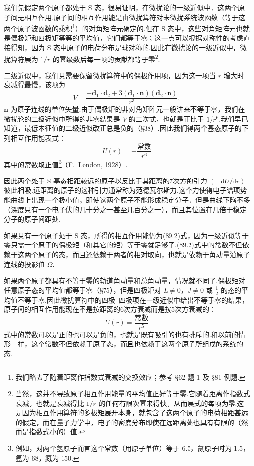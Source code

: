 我们先假定两个原子都处于 S 态，很易证明，在微扰论的一级近似中，这两个原子间无相互作用.原子间的相互作用能是由微扰算符对未微扰系统波函数（等于这两个原子波函数的乘积\footnote{我们略去了随着距离作指数式衰减的交换效应；参考 §62 题 1 及 §81 例题.}）的对角矩阵元确定的.但在 S 态中，这些对角矩阵元也就是偶极矩和四极矩等等的平均值，它们都等于零；这一点可以根据对称性的考虑直接得知，因为 S 态中原子的电荷分布是球对称的.因此在微扰论的一级近似中，微扰算符展为 $1/r$ 的幂级数后每一项的贡献都等于零\footnote{当然，这并不导致原子相互作用能量的平均值正好等于零.它随着距离作指数式衰减，也就是衰减得比 $1/r$ 的任何有限次幂来得快，从而展式的每项为零.这是因为相互作用算符的多极矩展开本身，就包含了这两个原子的电荷相距甚远的假定，而在量子力学中，电子的密度分布即使在远距离处也具有有限的（然而是指数式小的）值.}.

二级近似中，我们只需要保留微扰算符中的偶极作用项，因为这一项当 $r$ 增大时衰减得最慢，该项为
\begin{equation}
  V=\frac{-\boldsymbol{d}_1\cdot\boldsymbol{d}_2+3(\boldsymbol{d}_1\cdot\boldsymbol{n})(\boldsymbol{d}_2\cdot\boldsymbol{n})}{r^3},
\end{equation}
$\boldsymbol{n}$ 为原子连线的单位矢量.由于偶极矩的非对角矩阵元一般讲来不等于零，我们在微扰论的二级近似中所得的非零结果是 $V$ 的二次式，也就是正比于 $1/r^6$.我们早已知道，最低本征值的二级近似改正总是负的（§38）.因此我们得两个基态原子的下列相互作用能表式：
\begin{equation}
  U(r)=-\frac{\text{常数}}{r^6}
\end{equation}
其中的常数取正值\footnote{例如，对两个氢原子而言这个常数（用原子单位）等于 6.5，氦原子时为 1.5，氩为 68，氮为 150.}（F.~London, 1928）.

因此两个处于 S 基态相距较远的原子以反比于其距离的7次方的引力 $(-\mathrm{d}U/\mathrm{d}r)$ 彼此相吸.远距离的原子的这种引力通常称为范德瓦尔斯力.这个力使得电子谱项势能曲线上出现一个极小值，即使这两个原子不能形成稳定分子，但是曲线下陷不多（深度只有一个电子伏的几十分之一甚至几百分之一），而且其位置在几倍于稳定分子的原子间距处.

如果只有一个原子处于 S 态，所得的相互作用能仍为(89.2)式，因为一级近似等于零只需一个原子的偶极矩（和其它的矩）等于零就足够了.(89.2)式中的常数不但依赖于这两个原子的态，而且还依赖于两者的相对取向，也就是依赖于角动量沿原子连线的投影值 $\Omega$.

如果两个原子都具有不等于零的轨道角动量和总角动量，情况就不同了.偶极矩对任意原子态的平均值都等于零（§75），但是四极矩对 $L\neq0$，$J\neq0$ 或 $\frac{1}{2}$ 的态的平均值不等于零.因此微扰算符中的四极–四极项在一级近似中给出不等于零的结果，原子间的相互作用能现在不是按距离的6次方衰减而是按5次方衰减的：
\begin{equation}
  U(r)=\frac{\text{常数}}{r^5}
\end{equation}
式中的常数可以是正的也可以是负的，也就是既有吸引的也有排斥的.和以前的情形一样，这个常数不但依赖于原子态，而且也依赖于这两个原子所组成的系统的态.

